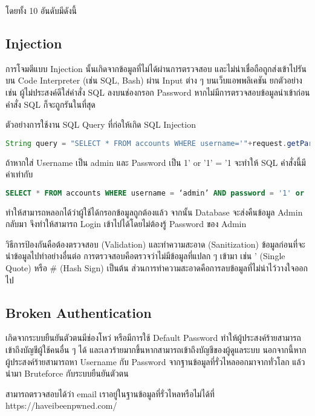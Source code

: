 โดยทั้ง 10 อันดับมีดังนี้

\subsection{Injection}

การโจมตีแบบ Injection นั้นเกิดจากข้อมูลที่ไม่ได้ผ่านการตรวจสอบ และไม่น่าเชื่อถือถูกส่งเข้าไปรันบน Code Interpreter (เช่น SQL, Bash) ผ่าน Input ต่าง ๆ บนเว็บแอพพลิเคชัน ยกตัวอย่างเช่น ผู้ไม่ประสงค์ดีใส่คำสั่ง SQL ลงบนช่องกรอก Password หากไม่มีการตรวจสอบข้อมูลนำเข้าก่อน คำสั่ง SQL ก็จะถูกรันในที่สุด

ตัวอย่างการใช้งาน SQL Query ที่ก่อให้เกิด SQL Injection

\begin{lstlisting}[language=Java, numbers=none] 
String query = "SELECT * FROM accounts WHERE username='"+request.getParameter("username") + "'" + "AND password ='" + request.getParameter("password") + "'";
\end{lstlisting}

ถ้าหากใส่ Username เป็น admin และ Password เป็น 1' or '1' = '1 จะทำให้ SQL คำสั่งนี้มีค่าเท่ากับ

\begin{lstlisting}[language=SQL, numbers=none] 
SELECT * FROM accounts WHERE username = ‘admin’ AND password = '1' or '1' = '1'
\end{lstlisting}

ทำให้สามารถหลอกได้ว่าผู้ใช้ได้กรอกข้อมูลถูกต้องแล้ว จากนั้น Database จะส่งคืนข้อมูล Admin กลับมา จึงทำให้สามารถ Login เข้าไปได้โดยไม่ต้องรู้ Password ของ Admin

วิธีการป้องกันคือต้องตรวจสอบ (Validation) และทำความสะอาด (Sanitization) ข้อมูลก่อนที่จะนำข้อมูลไปทำอย่างอื่นต่อ การตรวจสอบคือตรวจว่าไม่มีข้อมูลที่แปลก ๆ เข้ามา เช่น ' (Single Quote) หรือ \# (Hash Sign) เป็นต้น ส่วนการทำความสะอาดคือการลบข้อมูลที่ไม่น่าไว้วางใจออกไป

\subsection{Broken Authentication}

เกิดจากระบบยืนยันตัวตนมีช่องโหว่ หรือมีการใช้ Default Password ทำให้ผู้ประสงค์ร้ายสามารถเข้าถึงบัญชีผู้ใช้คนอื่น ๆ ได้ และเลวร้ายมากขึ้นหากสามารถเข้าถึงบัญชีของผู้ดูแลระบบ นอกจากนี้หากผู้ประสงค์ร้ายสามารถหา Username กับ Password จากฐานข้อมูลที่รั่วไหลออกมาจากทั่วโลก \cite{wiki:databreach} แล้วนำมา Bruteforce กับระบบยืนยันตัวตน

สามารถตรวจสอบได้ว่า email เราอยู่ในฐานข้อมูลที่รั่วไหลหรือไม่ได้ที่ https://haveibeenpwned.com/

